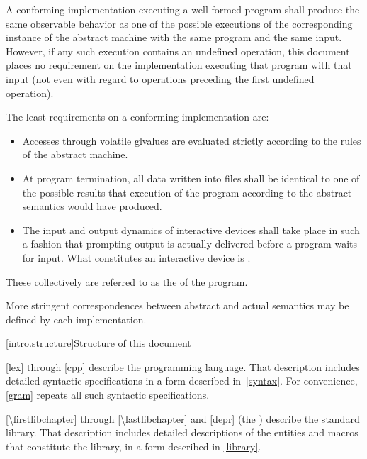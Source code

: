 \pnum
{}%
%
A conforming implementation executing a well-formed program shall
produce the same observable behavior as one of the possible executions
of the corresponding instance of the abstract machine with the
same program and the same input.
%
However, if any such execution contains an undefined operation, this document places no
requirement on the implementation executing that program with that input
(not even with regard to operations preceding the first undefined
operation).

\pnum
{}%
The least requirements on a conforming implementation are:
\begin{itemize}
\item
Accesses through volatile glvalues are evaluated strictly according to the
rules of the abstract machine.
\item
At program termination, all data written into files shall be
identical to one of the possible results that execution of the program
according to the abstract semantics would have produced.
\item
The input and output dynamics of interactive devices shall take
place in such a fashion that prompting output is actually delivered before a program waits for input. What constitutes an interactive device is
.
\end{itemize}

These collectively are referred to as the
 of the program.
\begin{note}
More stringent correspondences between abstract and actual
semantics may be defined by each implementation.
\end{note}

[intro.structure]{Structure of this document}

\pnum
{}%
%
\ref{lex} through \ref{cpp} describe the \Cpp{} programming
language. That description includes detailed syntactic specifications in
a form described in~\ref{syntax}. For convenience, \ref{gram}
repeats all such syntactic specifications.

\pnum
\ref{\firstlibchapter} through \ref{\lastlibchapter} and \ref{depr}
(the ) describe the \Cpp{} standard library.
That description includes detailed descriptions of the
entities and macros
that constitute the library, in a form described in \ref{library}.

